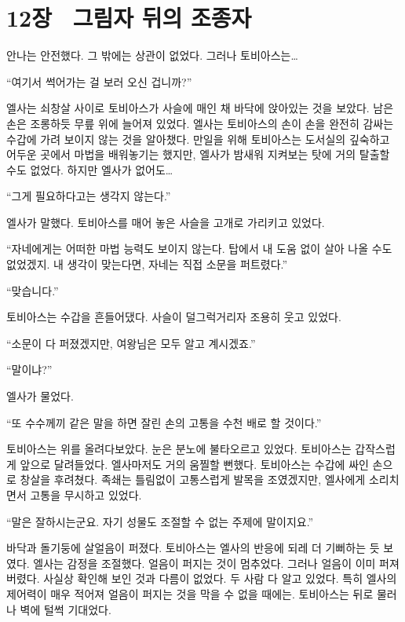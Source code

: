 

\chapter[12장  그림자 뒤의 조종자][12장\hspace*{.5em}그림자 뒤의 조종자]{12장 \ 그림자 뒤의 조종자}



안나는 안전했다. 그 밖에는 상관이 없었다. 그러나 토비아스는\ldots

``여기서 썩어가는 걸 보러 오신 겁니까?''

엘사는 쇠창살 사이로 토비아스가 사슬에 매인 채 바닥에 앉아있는 것을 보았다. 남은 손은 조롱하듯 무릎 위에 늘어져 있었다. 엘사는 토비아스의 손이 손을 완전히 감싸는 수갑에 가려 보이지 않는 것을 알아챘다. 만일을 위해 토비아스는 도서실의 깊숙하고 어두운 곳에서 마법을 배워놓기는 했지만, 엘사가 밤새워 지켜보는 탓에 거의 탈출할 수도 없었다. 하지만 엘사가 없어도\ldots

``그게 필요하다고는 생각지 않는다.''

엘사가 말했다. 토비아스를 매어 놓은 사슬을 고개로 가리키고 있었다.

``자네에게는 어떠한 마법 능력도 보이지 않는다. 탑에서 내 도움 없이 살아 나올 수도 없었겠지. 내 생각이 맞는다면, 자네는 직접 소문을 퍼트렸다.''

``맞습니다.''

토비아스는 수갑을 흔들어댔다. 사슬이 덜그럭거리자 조용히 웃고 있었다.

``소문이 다 퍼졌겠지만, 여왕님은 모두 알고 계시겠죠.''

`` 말이냐?''

엘사가 물었다.

``또 수수께끼 같은 말을 하면 잘린 손의 고통을 수천 배로 할 것이다.''

토비아스는 위를 올려다보았다. 눈은 분노에 불타오르고 있었다. 토비아스는 갑작스럽게 앞으로 달려들었다. 엘사마저도 거의 움찔할 뻔했다. 토비아스는 수갑에 싸인 손으로 창살을 후려쳤다. 족쇄는 틀림없이 고통스럽게 발목을 조였겠지만, 엘사에게 소리치면서 고통을 무시하고 있었다.

``말은 잘하시는군요. 자기 성물도 조절할 수 없는 주제에 말이지요.''

바닥과 돌기둥에 살얼음이 퍼졌다. 토비아스는 엘사의 반응에 되레 더 기뻐하는 듯 보였다. 엘사는 감정을 조절했다. 얼음이 퍼지는 것이 멈추었다. 그러나 얼음이 이미 퍼져버렸다. 사실상 확인해 보인 것과 다름이 없었다. 두 사람 다 알고 있었다. 특히 엘사의 제어력이 매우 적어져 얼음이 퍼지는 것을 막을 수 없을 때에는. 토비아스는 뒤로 물러나 벽에 털썩 기대었다.

